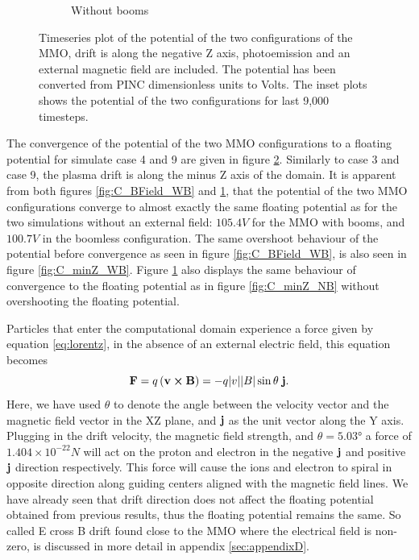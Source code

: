 \begin{figure}[H]
\begin{subfigure}[b]{0.75\textwidth}
  \caption{Without booms}
  \label{fig:C_BField_NB}
\end{subfigure}
\caption{Timeseries plot of the potential of the two configurations of the MMO, drift is along the negative Z axis, photoemission and an external magnetic field are included. The potential has been converted from PINC dimensionless units to Volts. The inset plots shows the potential of the two configurations for last 9,000 timesteps.}
\label{fig:Conv_BField}
\end{figure}

The convergence of the potential of the two MMO configurations to a floating potential for simulate case 4 and 9 are given in figure \ref{fig:Conv_BField}. Similarly to case 3 and case 9, the plasma drift is along the minus Z axis of the domain. It is apparent from both figures \ref{fig:C_BField_WB} and \ref{fig:C_BField_NB}, that the potential of the two MMO configurations converge to almost exactly the same floating potential as for the two simulations without an external field: $105.4 V$ for the MMO with booms, and $100.7 V$ in the boomless configuration. The same overshoot behaviour of the potential before convergence as seen in figure \ref{fig:C_BField_WB}, is also seen in figure \ref{fig:C_minZ_WB}. Figure \ref{fig:C_BField_NB} also displays the same behaviour of convergence to the floating potential as in figure \ref{fig:C_minZ_NB} without overshooting the floating potential.

Particles that enter the computational domain experience a force given by equation \eqref{eq:lorentz}, in the absence of an external electric field, this equation becomes
\begin{equation}
    \vb{F} = q\left(\vb{v} \cross \vb{B}\right) = - q \abs{v} \abs{B} \sin{\theta} \; \vb{j}.
\end{equation}
Here, we have used $\theta$ to denote the angle between the velocity vector and the magnetic field vector in the XZ plane, and $\vb{j}$ as the unit vector along the Y axis. Plugging in the drift velocity, the magnetic field strength, and $\theta = \ang{5.03}$  
a force of $1.404 \times 10^{-22} N$ will act on the proton and electron in the negative $\vb{j}$ and positive $\vb{j}$ direction respectively. This force will cause the ions and electron to spiral in opposite direction along guiding centers aligned with the magnetic field lines. We have already seen that drift direction does not affect the floating potential obtained from previous results, thus the floating potential remains the same. So called E cross B drift found close to the MMO where the electrical field is non-zero, is discussed in more detail in appendix \ref{sec:appendixD}. 

